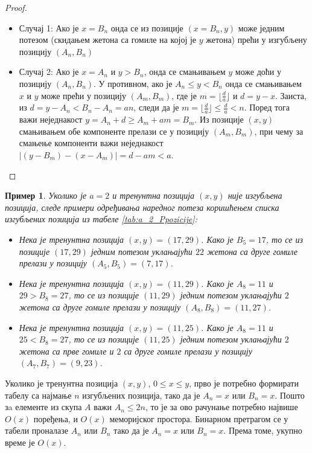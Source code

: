 \documentclass[a4paper]{article}
\newtheorem{example}{Пример}
\begin{document}
\begin{proof}
	\begin{itemize}
		\item \label{case:slucaj1} Случај 1: Ако је $ x = B_{n} $ онда се из позиције $ (x = B_{n}, y) $ може једним потезом (скидањем жетона са гомиле на којој је $ y $ жетона) прећи у изгубљену позицију $ (A_{n}, B_{n}) $ 
		\item \label{case:slucaj2} Случај 2: Ако је $ x = A_{n} $ и $ y > B_{n} $, онда се смањивањем $ y $ може доћи у позицију $ (A_{n}, B_{n}) $. У противном, ако је $ A_{n} \le y < B_{n} $ онда се смањивањем $ x $ и $ y $ може прећи у позицију $ (A_{m}, B_{m}) $, где је $ m = \lfloor \frac{d}{a} \rfloor $ и $ d = y - x $. Заиста, из $ d = y - A_{n} < B_{n} - A_{n} = an $, следи да је  $ m = \lfloor \frac{d}{a} \rfloor \le \frac{d}{a} < n $. Поред тога важи неједнакост $ y = A_{n} + d \ge A_{m} + am = B_m $. Из позиције $ (x, y) $ смањивањем обе компоненте прелази се у позицију $ (A_{m}, B_{m}) $, при чему за смањење компоненти важи неједнакост $ |(y - B_{m}) - (x - A_{m})| = d - am < a $.
	\end{itemize}
	
\end{proof}

\begin{example}
	Уколико је $ a = 2 $ и тренунтна позиција $ (x, y) $ није изгубљена позиција, следе примери одређивања наредног потеза коришћењем списка изгубљених позиција из табеле \ref{tab:a_2_Ppozicije}:
	\begin{itemize}
		\item Нека је тренунтна позиција $ (x, y) = (17, 29) $. Како је $ B_{5} = 17 $, то се из позиције $ (17, 29) $ једним потезом уклањајући $ 22 $ жетона са друге гомиле прелази у позицију $ (A_{5}, B_{5}) = (7, 17) $. 
		\item Нека је тренунтна позиција $ (x, y) = (11, 29) $. Како је $ A_{8} = 11 $ и $ 29 > B_{8} = 27 $, то се из позиције $ (11, 29) $ једним потезом уклањајући $ 2 $ жетона са друге гомиле прелази у позицију $ (A_{8}, B_{8}) = (11, 27) $.
		\item Нека је тренунтна позиција $ (x, y) = (11, 25) $. Како је $ A_{8} = 11 $ и $ 25 < B_{8} = 27 $, то се из позиције $ (11, 25) $ једним потезом уклањајући $ 2 $ жетона са прве гомиле и $ 2 $ са друге гомиле прелази у позицију $ (A_{7}, B_{7}) = (9, 23) $.
	\end{itemize}
\end{example}

Уколико је тренунтна позиција $ (x, y) $, $ 0 \leq x \leq y $, прво је потребно формирати табелу са најмање $ n $ изгубљених позиција, тако да је $ A_{n} = x $ или $ B_{n} = x $. Пошто зa елементе из скупа $ A $ важи $ A_{n} \leq 2n $, то је за ово рачунање потребно највише $ O(x) $ поређења, и $ O(x) $ меморијског простора. Бинарном претрагом се у табели проналазе $ A_{n} $ или $ B_{n} $ тако да је $ A_{n} = x $ или $ B_{n} = x $. Према томе, укупно време је $ O(x) $.
\end{document}
